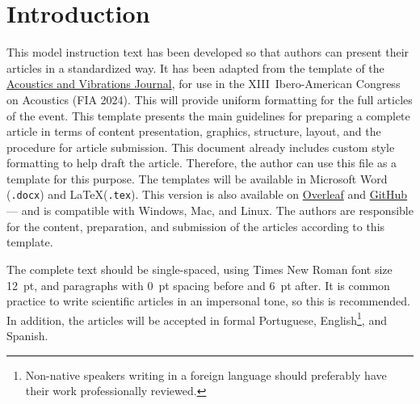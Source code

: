 
\section{Introduction}

This model instruction text has been developed so that authors can present their articles in a standardized way.
It has been adapted from the template of the \href{https://revista.acustica.org.br}{Acoustics and Vibrations Journal}, for use in the XIII~Ibero-American Congress on Acoustics (FIA 2024).
%
This will provide uniform formatting for the full articles of the event.
This template presents the main guidelines for preparing a complete article in terms of content presentation, graphics, structure, layout, and the procedure for article submission. 
%
This document already includes custom style formatting to help draft the article. Therefore, the author can use this file as a template for this purpose. The templates will be available in Microsoft Word (\texttt{.docx}) and \LaTeX\xspace (\texttt{.tex}). This version is also available on \href{https://www.overleaf.com/read/tjbcfwbtfdtz\#869489}{Overleaf} and \href{https://github.com/willdfonseca/latex}{GitHub} --- and is compatible with Windows, Mac, and Linux. 
%
The authors are responsible for the content, preparation, and submission of the articles according to this template.

The complete text should be single-spaced, using Times New Roman font size 12~pt, and paragraphs with 0~pt spacing before and 6~pt after. It is common practice to write scientific articles in an impersonal tone, so this is recommended. In addition, the articles will be accepted in formal Portuguese, English\footnote{Non-native speakers writing in a foreign language should preferably have their work professionally reviewed.}, and Spanish\footnotemark[2]. 

